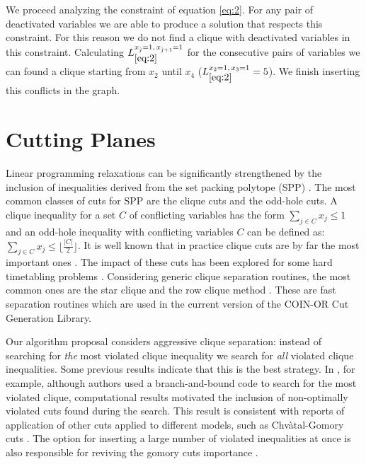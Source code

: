 \documentclass{endm}
\begin{document}
\begin{example}
We proceed analyzing the constraint of equation \ref{eq:2}. For any pair of deactivated variables we are able to produce a solution that respects this constraint. For this reason we do not find a clique with deactivated variables in this constraint. Calculating $L_{\ref{eq:2}}^{x_{\hat{j}}=1,\, x_{\hat{j}+1}=1}$ for the consecutive pairs of variables we can found a clique starting from $x_2$ until $x_4$ ($L_{\ref{eq:2}}^{x_{2}=1,\, x_{3}=1} = 5$). We finish inserting this conflicts in the graph.

\end{example}


\section{Cutting Planes}\label{cut}

Linear programming relaxations can be significantly strengthened by the inclusion of inequalities derived from the set packing polytope (SPP) \cite {Padberg1973}. The most common classes of cuts for SPP are the clique cuts and the odd-hole cuts. A clique inequality for a set $C$ of conflicting variables has the form $\sum_{j\in C}x_{j} \leq 1$ and an odd-hole inequality with conflicting variables $C$ can be defined as: $\sum_{j\in C}x_{j} \leq \lfloor \frac{|C|}{2}\rfloor$. It is well known that in practice clique cuts are by far the most important ones \cite{Borndorfer1998}. The impact of these cuts has been explored for some hard timetabling problems \cite{Avella2005,Marecek2012}. Considering generic clique separation routines, the most common ones are the star clique and the row clique method \cite{Eso1999a,Hoffman1993,Borndorfer1998}. These are fast separation routines which are used in the current version of the COIN-OR Cut Generation Library.  

Our algorithm proposal considers aggressive clique separation: instead of searching for \emph{the} most violated clique inequality we search for \emph{all} violated clique inequalities. Some previous results indicate that this is the best strategy. In \cite{Marecek2012}, for example, although authors used a branch-and-bound code to search for the most violated clique, computational results motivated the inclusion of non-optimally violated cuts found during the search. This result is consistent with reports of application of other cuts applied to different models, such as {C}hv\`{a}tal-Gomory cuts \cite{Fischetti2007}. The option for inserting a large number of violated inequalities at once is also responsible for reviving the gomory cuts importance \cite {Cornuejols2007}.
\end{document}
